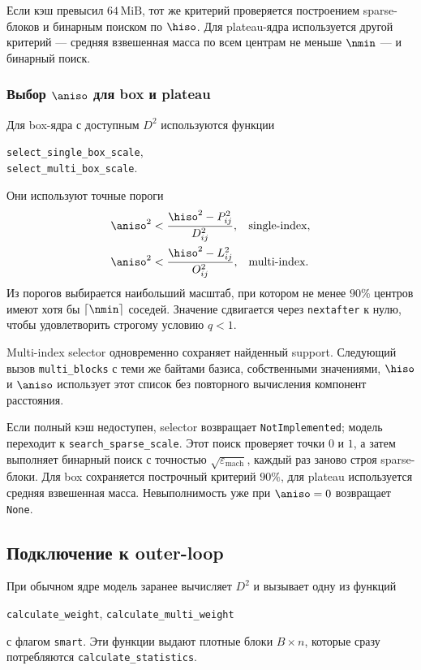 Если кэш превысил $64\,\mathrm{MiB}$, тот же критерий проверяется
построением sparse-блоков и бинарным поиском по $\hiso$. Для
plateau-ядра используется другой критерий --- средняя взвешенная
масса по всем центрам не меньше $\nmin$ --- и бинарный поиск.

\subsubsection{Выбор $\aniso$ для box и plateau}

Для box-ядра с доступным $D^2$ используются функции
\begin{center}
    \texttt{select\_single\_box\_scale},\\
    \texttt{select\_multi\_box\_scale}.
\end{center}
Они используют точные пороги
\begin{align}
    \aniso^2
    &<\frac{\hiso^2-P_{ij}^2}{D_{ij}^2},
    &&\text{single-index},
    \\
    \aniso^2
    &<\frac{\hiso^2-L_{ij}^2}{O_{ij}^2},
    &&\text{multi-index}.
\end{align}
Из порогов выбирается наибольший масштаб, при котором не менее $90\%$
центров имеют хотя бы $\lceil\nmin\rceil$ соседей. Значение
сдвигается через \texttt{nextafter} к нулю, чтобы удовлетворить
строгому условию $q<1$.

Multi-index selector одновременно сохраняет найденный support.
Следующий вызов \texttt{multi\_blocks} с теми же байтами базиса,
собственными значениями, $\hiso$ и $\aniso$ использует этот список
без повторного вычисления компонент расстояния.

Если полный кэш недоступен, selector возвращает
\texttt{NotImplemented}; модель переходит к
\texttt{search\_sparse\_scale}. Этот поиск проверяет точки $0$ и $1$,
а затем выполняет бинарный поиск с точностью
$\sqrt{\varepsilon_{\mathrm{mach}}}$, каждый раз заново строя
sparse-блоки. Для box сохраняется построчный критерий $90\%$, для
plateau используется средняя взвешенная масса. Невыполнимость уже
при $\aniso=0$ возвращает \texttt{None}.

\subsection{Подключение к outer-loop}

При обычном ядре модель заранее вычисляет $D^2$ и вызывает одну из
функций
\begin{center}
    \texttt{calculate\_weight},\qquad
    \texttt{calculate\_multi\_weight}
\end{center}
с флагом \texttt{smart}. Эти функции выдают плотные блоки
$B\times n$, которые сразу потребляются
\texttt{calculate\_statistics}.

